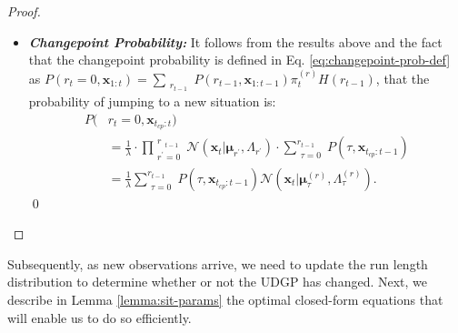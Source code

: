 \documentclass[Afour,sageh,times]{sagej}
\theoremstyle{lemma}
\begin{document}
\begin{proof}
\begin{itemize}[leftmargin=0.45cm]
        Therefore, the permanence probability at time $t$, given that we consider the time of the previous changepoint $t_{cp}$ to be zero, is:
        \begin{align}
            P(&r_t = r_{t-1} + 1, \boldsymbol{x}_{0:t}) \nonumber\\ &= \frac{\lambda - 1}{\lambda} \cdot \prod_{\substack{r^\prime = 0}}^{\substack{r}_{t-1}} \mathcal{N} (\boldsymbol{x}_t | \boldsymbol{\mu}_{r^\prime}, \Lambda_{r^\prime}) \cdot P(r_{t-1}, \boldsymbol{x}_{0:t-1}) \nonumber \\
            &= \frac{\lambda - 1}{\lambda} P(r_{t-1}, \boldsymbol{x}_{t_{cp}:t-1})  
                \mathcal{N} (\boldsymbol{x}_t | \boldsymbol{\mu}_{t-1}^{(r)}, \Lambda_{t-1}^{(r)}). \nonumber
        \end{align}

        \item \textit{\textbf{Changepoint Probability:}} It follows from the results above and the fact that the changepoint probability is defined in Eq. \eqref{eq:changepoint-prob-def} as $P(r_t=0, \boldsymbol{x}_{1:t}) = \sum_{\substack{r_{t-1}}} P(r_{t-1}, \boldsymbol{x}_{1:t-1}) \pi_t^{(r)} H(r_{t-1})$, that the probability of jumping to a new situation is:
        \begin{align*}
            P(&r_t = 0, \boldsymbol{x}_{t_{cp}:t}) \\ &= \frac{1}{\lambda}  \cdot \prod_{\substack{r^\prime = 0}}^{\substack{r}_{t-1}} \mathcal{N} (\boldsymbol{x}_t | \boldsymbol{\mu}_{r^\prime}, \Lambda_{r^\prime}) \cdot   \sum_{\substack{\tau = 0}}^{r_{t-1}} P(\tau, \boldsymbol{x}_{t_{cp}:t-1})  \\
            &= \frac{1}{\lambda} \sum_{\substack{\tau = 0}}^{r_{t-1}} P(\tau, \boldsymbol{x}_{t_{cp}:t-1}) 
                \mathcal{N} (\boldsymbol{x}_t | \boldsymbol{\mu}_{\tau}^{(r)}, \Lambda_{\tau}^{(r)}).
        \end{align*}
    \qed
    \end{itemize}
\end{proof}

Subsequently, as new observations arrive, we need to update the run length distribution to determine whether or not the UDGP has changed. Next, we describe in Lemma \ref{lemma:sit-params} the optimal closed-form equations that will enable us to do so efficiently.
\end{document}
